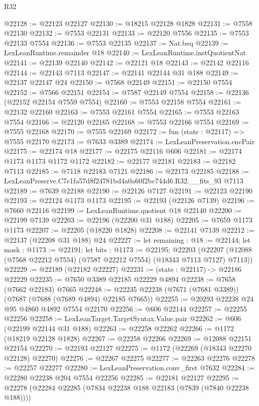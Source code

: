 \begin{lexlean}{R32}
\begin{coremodule}
@22128 := @22123 @22127
@22130 := @18215 @22128 @1828
@22131 := @7558 @22130
@22132 := @7553 @22131
@22133 := @22120 @7556
@22135 := @7553 @22133 @7554
@22136 := @7553 @22135
@22137 := Nat.beq
@22139 := LexLeanRuntime.remainder @18
@22140 := LexLeanRuntime.instQuotientNat
@22141 := @22139 @22140
@22142 := @22121 @18
@22143 := @22142 @22116
@22144 := @22143 @7113
@22147 := @22141 @22144 @31 @188
@22149 := @22137 @22147 @24
@22150 := @7568 @22149
@22151 := @22150 @7554
@22152 := @7566 @22151
@22154 := @7587 @22149 @7554
@22158 := @22136 (@22152 @22154 @7559 @7554)
@22160 := @7553 @22158 @7554
@22161 := @22132 @22160
@22163 := @7553 @22161 @7554
@22165 := @7553 @22163 @7554
@22166 := @22120 @22165
@22168 := @7553 @22166 @7554
@22169 := @7555 @22168
@22170 := @7555 @22169
@22172 := fun (state : @22117) => @7555 @22170
@22173 := @7633 @3389
@22174 := LexLeanPreservation.encPair
@22175 := @22174 @18
@22177 := @22175 @22116 @606
@22181 := @22174 @1173 @1173 @1172 @1172
@22182 := @22177 @22181
@22183 := @22182 @7113
@22185 := @7118 @22183 @7121
@22186 := @22173 @22185
@22188 := LexLeanPreserve.C7e1fa57d8f24781bd4a0a60f2bc744d6.R32.__fits_93 @7113
@22189 := @7639 @22188
@22190 := @22126 @7127
@22191 := @22123 @22190
@22193 := @22124 @1173 @1173
@22195 := @22193 (@22126 @7139)
@22196 := @7660 @22116
@22199 := LexLeanRuntime.quotient @18 @22140
@22200 := @22199 @7139
@22203 := @22196 (@22200 @31 @188)
@22205 := @7659 @1173 @1173
@22207 := @22205 (@18220 @1828)
@22208 := @22141 @7139
@22212 := @22137 (@22208 @31 @188) @24
@22227 := let remaining : @18 := @22144;
  let mask : @1173 := @22191;
  let bits : @1173 := @22195;
  @22203 (@22207 (@12088 (@7568 @22212 @7554) (@7587 @22212 @7554) (@18343 @7113 @7127) @7113))
@22229 := @22189 (@22182 @22227)
@22231 := (state : @22117) -> @22186 @22229
@22235 := @7650 @3389 @22185 @22229 @4894
@22238 := @7658 (@7662 @22183) @7665
@22248 := @22235 @22238 (@7671 (@7681 @3389)) (@7687 (@7688 (@7689 @4894) @22185 @7665))
@22255 := @20293 @22238 @24 @95 @4860 @4892 @7554 @22170
@22256 := @606 @22144
@22257 := @22255 @22256
@22258 := LexLeanTarget.TargetSyntax.Value.pair
@22262 := @606 (@22199 @22144 @31 @188)
@22263 := @22258 @22262
@22266 := @1172 (@18219 @22128 @1828)
@22267 := @22258 @22266
@22269 := @12088 @22151 @22154
@22270 := @22193 @22127
@22275 := @1172 (@22269 (@18343 @22270 @22128) @22270)
@22276 := @22267 @22275
@22277 := @22263 @22276
@22278 := @22257 @22277
@22280 := LexLeanPreservation.conv_first @7632
@22284 := @22280 @22238 @204 @7554 @22256
@22285 := @22181 @22127
@22295 := @22278 (@22284 @22285 (@7834 @22238 @188 @22183 (@7839 (@7840 @22238 @188))))

\end{coremodule}
\end{lexlean}
